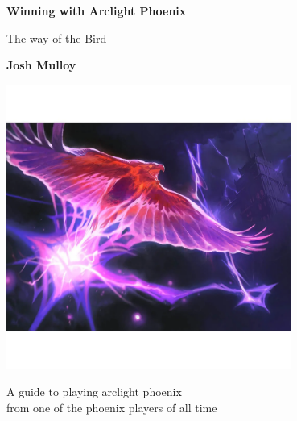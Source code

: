 \documentclass[12pt]{article}
\begin{document}
\begin{titlepage}
    \begin{center}
        \vspace*{1cm}

        \textbf{Winning with Arclight Phoenix}

        \vspace{0.5cm}
        The way of the Bird

        \vspace{1.5cm}

        \textbf{Josh Mulloy}

        \vspace{0.8cm}

        \includegraphics[width=0.7\textwidth]{arclight}

        \vfill

        A guide to playing arclight phoenix\\
        from one of the phoenix players of all time
    \end{center}
\end{titlepage}

\tableofcontents

\clearpage
\end{document}

